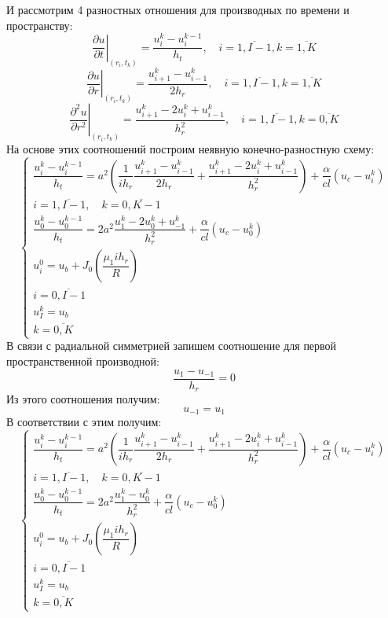 \documentclass[a4paper,12pt,russian, fleqn]{extreport}
\begin{document}
	И рассмотрим 4 разностных отношения для производных по времени и пространству:	
	\begin{equation*}
	\left.\dfrac{\partial u}{\partial t}\right|_{(r_i,t_k)} = \dfrac{u_i^k-u_i^{k-1}}{h_t}, \quad i = \overline{1, I-1}, k = \overline{1,K}
	\end{equation*}	
	\begin{equation*}
	\left.\dfrac{\partial u}{\partial r}\right|_{(r_i, t_k)} = \dfrac{u_{i+1}^k - u_{i-1}^k}{2h_r}, \quad i = \overline{1,I-1}, k = \overline{1,K}
	\end{equation*}	
	\begin{equation*}
	\left.\dfrac{\partial^2 u}{\partial r^2}\right|_{(r_i, t_k)} = \dfrac{u_{i+1}^k - 2u_i^k + u_{i-1}^k}{h^2_r}, \quad i = \overline{1,I-1}, k = \overline{0,K}
	\end{equation*}
	На основе этих соотношений построим неявную конечно-разностную схему:
	\begin{equation*}
		\left\{\begin{array}{l}
			\dfrac{u_i^{k}-u_i^{k-1}}{h_t} = a^2\left(\dfrac{1}{ih_r}\dfrac{u_{i+1}^k - u_{i-1}^k}{2h_r} +\dfrac{u_{i+1}^k - 2u_i^k + u_{i-1}^k}{h^2_r}\right) + \dfrac{\alpha}{cl}\left (u_c - u_i^k \right) \\
			i = \overline{1,I-1}, \quad k = \overline{0,K-1}	 \\
			\dfrac{u_0^{k}-u_0^{k-1}}{h_t} = 2a^2\dfrac{u_1^k-2u_0^k+u_{-1}^k}{h_r^2} + \dfrac{\alpha}{cl}(u_c-u_0^k) \\
			u_i^0 = u_b + J_0\left( \dfrac{\mu_1 ih_r}{R} \right) \\
			i = \overline{0, I-1} \\
			u_I^k = u_b \\
		k = \overline{0,K}
	\end{array}\right.
	\end{equation*}
	В связи с радиальной симметрией запишем соотношение для первой пространственной производной:
	\begin{equation*}
		\dfrac{u_1 - u_{-1}}{h_r} = 0
	\end{equation*}
	Из этого соотношения получим:
	\begin{equation*}
		u_{-1} = u_1
	\end{equation*}
	В соответствии с этим получим:
	\begin{equation}\label{ImplicitScheme}
		\left\{\begin{array}{l}
			\dfrac{u_i^{k}-u_i^{k-1}}{h_t} = a^2\left(\dfrac{1}{ih_r}\dfrac{u_{i+1}^k - u_{i-1}^k}{2h_r} +\dfrac{u_{i+1}^k - 2u_i^k + u_{i-1}^k}{h^2_r}\right) + \dfrac{\alpha}{cl}\left (u_c - u_i^k \right) \\
			i = \overline{1,I-1}, \quad k = \overline{0,K-1}	 \\
			\dfrac{u_0^{k}-u_0^{k-1}}{h_t} = 2a^2\dfrac{u_1^k-u_0^k}{h_r^2} + \dfrac{\alpha}{cl}(u_c-u_0^k) \\
			u_i^0 = u_b + J_0\left( \dfrac{\mu_1 ih_r}{R} \right) \\
			i = \overline{0, I-1} \\
			u_I^k = u_b \\
			k = \overline{0,K}
		\end{array}\right.
	\end{equation}
\end{document}
